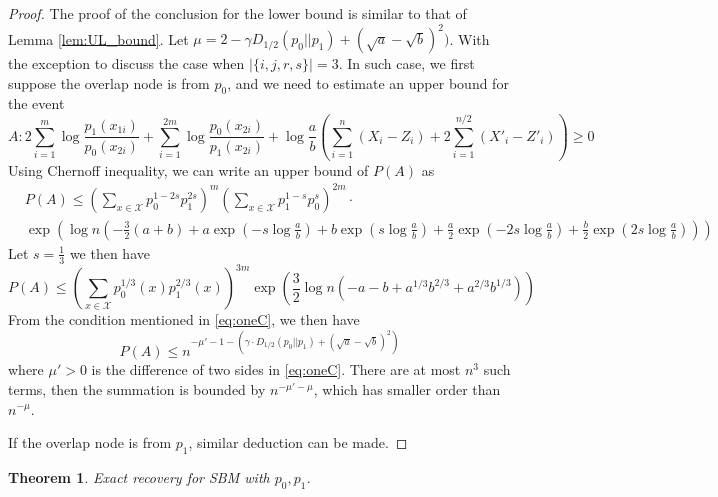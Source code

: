 \documentclass{article}
\newtheorem{theorem}{Theorem}
\begin{document}
\begin{proof}
	The proof of the conclusion for the lower bound is similar to that of Lemma \ref{lem:UL_bound}.
	Let $\mu = 2 -\gamma D_{1/2}(p_0||p_1) + (\sqrt{a} - \sqrt{b})^2) $.
	With the exception to discuss the case when $|\{i,j,r,s\}|=3$. In such case, we first suppose the overlap node is from $p_0$, and we need to estimate
	an upper bound for the event
	$$
	A: 2\sum_{i=1}^m  \log \frac{p_1(x_{1i})}{p_0(x_{2i})}
	+ \sum_{i=1}^{2m} \log \frac{p_0(x_{2i})}{p_1(x_{2i})} +\log\frac{a}{b}\left(
	\sum_{i=1}^{n} (X_i - Z_i) + 2\sum_{i=1}^{n/2} (X'_i - Z'_i)\right) \geq 0
	$$
	Using Chernoff inequality, we can write an upper bound of $P(A)$ as
	\begin{align*}
	&P(A) \leq  (\sum_{x\in \mathcal{X}} p_0^{1-2s}p_1^{2s})^m (\sum_{x\in \mathcal{X}} p_1^{1-s}p_0^{s})^{2m} \cdot \\
	&\exp(\log n (-\frac{3}{2}(a+b)+a\exp(-s\log \frac{a}{b})+b\exp(s\log \frac{a}{b}) + \frac{a}{2}\exp(-2s\log \frac{a}{b})+\frac{b}{2}\exp(2s\log \frac{a}{b})))
	\end{align*}
	Let $s=\frac{1}{3}$ we then have
	$$
	P(A)\leq (\sum_{x\in \mathcal{X}} p_0^{1/3}(x)p_1^{2/3}(x))^{3m}\exp(\frac{3}{2}\log n (-a-b+a^{1/3}b^{2/3}+a^{2/3}b^{1/3}))
	$$
	From the condition mentioned in \eqref{eq:oneC},
	we then have
	$$
	P(A) \leq n^{-\mu'-1-(\gamma \cdot D_{1/2}(p_0||p_1) + (\sqrt{a} - \sqrt{b})^2)}
	$$
	where $\mu'>0$ is the difference of two sides in \eqref{eq:oneC}. 
	There are at most $n^3$ such terms, then the summation is bounded by
	$n^{-\mu'-\mu }$,
	which has smaller order than $n^{-\mu}$.
	
	If the overlap node is from $p_1$, similar deduction can be made.
\end{proof}
\begin{theorem}
	Exact recovery for SBM with $p_0, p_1$.
\end{theorem}
\end{document}
